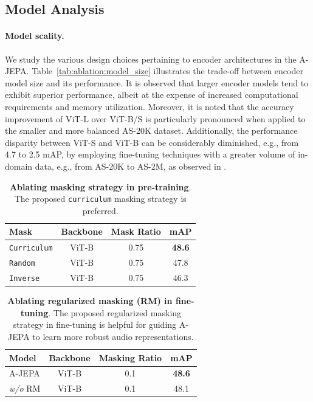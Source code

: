 \documentclass{article}
\begin{document}
\subsection{Model Analysis}

\paragraph{Model scality.}
We study the various design choices pertaining to encoder architectures in the A-JEPA.
Table~\ref{tab:ablation:model_size} illustrates the trade-off between encoder model size and its performance. 
It is observed that larger encoder models tend to exhibit superior performance, albeit at the expense of increased computational requirements and memory utilization. 
Moreover, it is noted that the accuracy improvement of ViT-L over ViT-B/S is particularly pronounced when applied to the smaller and more balanced AS-20K dataset. Additionally, the performance disparity between ViT-S and ViT-B can be considerably diminished, e.g., from 4.7 to 2.5 mAP, by employing fine-tuning techniques with a greater volume of in-domain data, e.g., from AS-20K to AS-2M, as observed in \cite{huang2022masked}. 



\begin{table}[t!]
\centering
    \begin{tabular}{lccc}
    
        \textbf{Mask} & \textbf{Backbone} & \textbf{Mask Ratio} & \textbf{mAP}\\
        \midrule
        \texttt{Curriculum} &ViT-B &0.75 & \textbf{48.6} \\
        \texttt{Random} &ViT-B & 0.75 & 47.8 \\
        \texttt{Inverse} &ViT-B  & 0.75 & 46.3 \\
         
    \end{tabular}   
    \caption{\textbf{Ablating masking strategy in pre-training}. The proposed \texttt{curriculum} masking strategy is preferred.}
    \label{fig:masking_comparison}
\end{table}      

\begin{table}[t!]
\centering
    \begin{tabular}{lccc}
    
        \textbf{Model} &\textbf{Backbone} & \textbf{Masking Ratio} & \textbf{mAP}\\
        \midrule
        A-JEPA &ViT-B &0.1 & \textbf{48.6} \\
       \emph{w/o} RM &ViT-B & 0.1 & 48.1 \\
         
    \end{tabular}   
    \caption{\textbf{Ablating regularized masking (RM) in fine-tuning}. The proposed regularized masking strategy in fine-tuning is helpful for guiding A-JEPA to learn more robust audio representations.}
    \label{tab:ft}
\end{table}      
\end{document}
